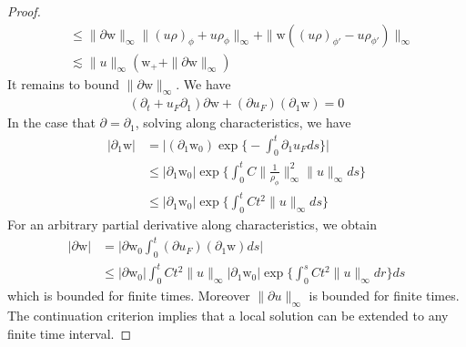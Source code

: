 \documentclass[11pt,letterpaper]{amsart}
\theoremstyle{plain}
\theoremstyle{definition}
\theoremstyle{remark}
\renewcommand{\leq}{\leqslant}
\def \wt {\mathrm{w}}
\begin{document}
\begin{proof}
\begin{align*}
            &\leq \|\partial \wt\|_{\infty} \|(u\rho)_{\phi} + u \rho_{\phi}\|_{\infty} + \|\wt ((u\rho)_{\phi'} - u \rho_{\phi'}) \|_{\infty} \\
            &\lesssim \|u\|_{\infty} (\wt_+ + \|\partial \wt\|_{\infty})
    \end{align*}
    It remains to bound $\|\partial \wt\|_{\infty}$. We have 
    \begin{align*}
        (\partial_t + u_F \partial_1) \partial \wt + (\partial u_F)  (\partial_1 \wt) = 0 
    \end{align*}
    In the case that $\partial = \partial_1$, solving along characteristics, we have 
    \begin{align*}
        |\partial_1 \wt|
            &= \big| (\partial_1 \wt_0) \exp \Big\{ - \int_0^t \partial_1 u_F ds \Big\} \big| \\
            &\leq |\partial_1 \wt_0|
                \exp \Big\{ \int_0^t C \Big\| \frac{1}{\rho_{\phi}} \Big\|_{\infty}^2 \|u\|_{\infty} ds \Big\} \\
            &\leq |\partial_1 \wt_0|
                \exp \Big\{ \int_0^t C t^2 \|u\|_{\infty} ds \Big\}
    \end{align*}
    For an arbitrary partial derivative along characteristics, we obtain 
    \begin{align*}
        |\partial \wt|
            &= \big| \partial \wt_0 \int_0^t (\partial u_F) (\partial_1 \wt) ds \big|  \\
            &\leq |\partial \wt_0| \int_0^t Ct^2 \|u\|_{\infty}  |\partial_1 \wt_0|
            \exp \Big\{ \int_0^s C t^2 \|u\|_{\infty} dr \Big\} ds 
    \end{align*}
    which is bounded for finite times. Moreover $\|\partial u\|_{\infty}$ is bounded for finite times. 
    The continuation criterion implies that a local solution can be extended to any finite time interval.

\end{proof}







\end{document}
